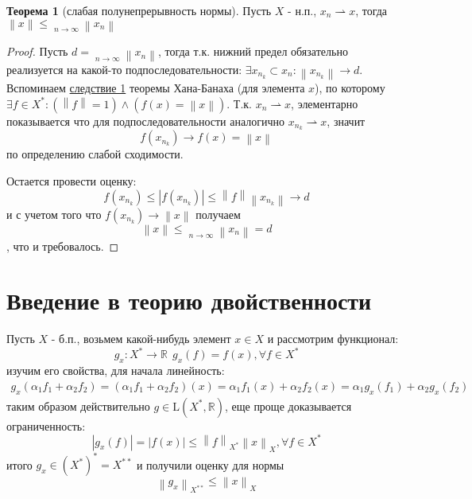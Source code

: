 \documentclass[12pt,a4paper]{article}
\theoremstyle{definition}
\newtheorem{theorem}{Теорема}
\newcommand{\Real}{\mathbb{R}}
\newcommand{\norm}[1]{\left\lVert#1\right\rVert}
\DeclareMathOperator*\lowlim{\underline{lim}}
\newcommand{\linear}[2]{\textrm{L}(#1, #2)}
\newcommand{\conj}[1]{\left(#1\right)^*}
\newcommand{\weakto}{\rightharpoonup}
\begin{document}
\begin{theorem}[слабая полунепрерывность нормы]
	Пусть $X$ - н.п., $x_n \weakto x$, тогда $\norm{x} \leq \lowlim\limits_{n \to \infty}{\norm{x_n}}$
\end{theorem}
\begin{proof}
	Пусть $d = \lowlim\limits_{n \to \infty}{\norm{x_n}}$, тогда т.к. нижний предел обязательно реализуется на какой-то подпоследовательности: $\exists{x_{n_k}} \subset{x_n}: \norm{x_{n_k}} \to d$. Вспоминаем \hyperref[corll:1]{следствие 1} теоремы Хана-Банаха (для элемента $x$), по которому \\ $\exists f \in X^*: (\norm{f} = 1) \wedge (f(x) = \norm{x})$. Т.к. $x_n \weakto x$, элементарно показывается что для подпоследовательности аналогично $x_{n_k} \weakto x$, значит 
	$$f(x_{n_k}) \to f(x) = \norm{x}$$
	по определению слабой сходимости.
	
	Остается провести оценку:
	$$f(x_{n_k}) \leq |f(x_{n_k})| \leq \norm{f} \norm{x_{n_k}} \to d$$
	и с учетом того что $f(x_{n_k}) \to \norm{x}$ получаем
	$$\norm{x} \leq \lowlim\limits_{n \to \infty}{\norm{x_n}} = d$$
	, что и требовалось.
\end{proof}

\section{Введение в теорию двойственности}
Пусть $X$ - б.п., возьмем какой-нибудь элемент $x \in X$ и рассмотрим функционал:
\begin{equation}\label{eq:5}
	g_{x}: X^* \to \Real \ \ g_{x}(f) = f(x), \forall f \in X^*
\end{equation}
изучим его свойства, для начала линейность:
\begin{multline*}
		g_{x}(\alpha_1 f_1 + \alpha_2 f_2) = (\alpha_1 f_1 + \alpha_2 f_2)(x) = \alpha_1 f_1 (x) + \alpha_2 f_2 (x) = \alpha_1 g_{x}(f_1) + \alpha_2 g_{x}(f_2)
\end{multline*}
таким образом действительно $g \in \linear{X^*}{\Real}$, еще проще доказывается ограниченность:
\begin{equation*}
	|g_{x}(f)| = |f(x)| \leq \norm{f}_{X^*} \norm{x}_{X}, \forall f \in X^*
\end{equation*}
итого $g_{x} \in \conj{X^*} = X^{**}$ и получили оценку для нормы 
\begin{equation}\label{eq:4}
	\norm{g_{x}}_{X^{**}} \leq \norm{x}_X
\end{equation}
\end{document}
